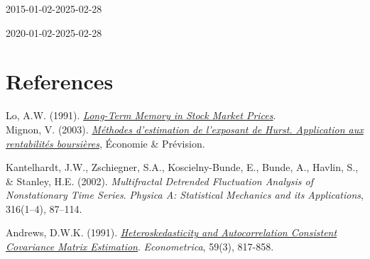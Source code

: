 \documentclass[11pt]{extarticle}
\begin{document}
\begin{table}[!h]
    \centering
    \caption{2015-01-02-2025-02-28}
    \label{tab:performance_table_2015-01-02}
\end{table}

\begin{table}[!h]
    \centering
    \caption{2020-01-02-2025-02-28}
    \label{tab:performance_table_2020-01-02}
\end{table}

\section{References}

Lo, A.W. (1991). \textit{\href{http://www.e-m-h.org/Lo\_\_91.pdf}{Long-Term Memory in Stock Market Prices}}. \\

Mignon, V. (2003). \textit{\href{https://www.persee.fr/doc/ecop_0249-4744_1998_num_132_1_5909}{Méthodes d'estimation de l'exposant de Hurst. Application aux rentabilités boursières}}, Économie \& Prévision.

Kantelhardt, J.W., Zschiegner, S.A., Koscielny-Bunde, E., Bunde, A., Havlin, S., \& Stanley, H.E. (2002). \textit{Multifractal Detrended Fluctuation Analysis of Nonstationary Time Series}. \textit{Physica A: Statistical Mechanics and its Applications}, 316(1--4), 87--114.

Andrews, D.W.K. (1991). \textit{\href{https://www.jstor.org/stable/2938229}{Heteroskedasticity and Autocorrelation Consistent Covariance Matrix Estimation}}. \textit{Econometrica}, 59(3), 817-858.
\end{document}
